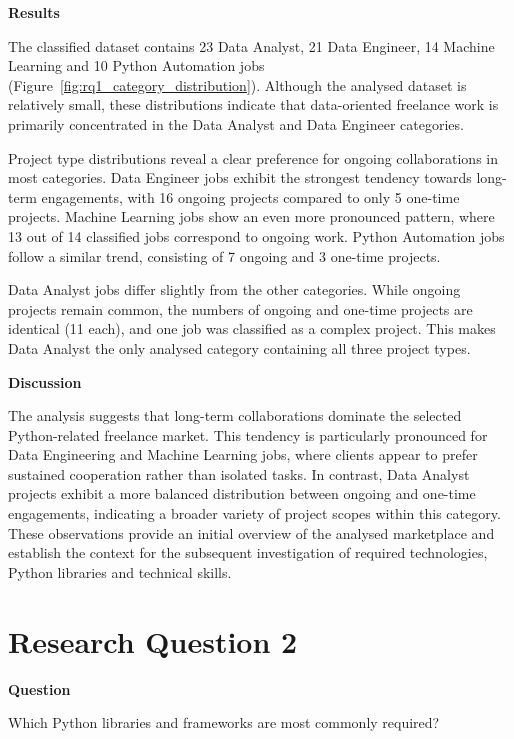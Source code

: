 \medskip

\textbf{Results}

The classified dataset contains 23 Data Analyst, 21 Data Engineer, 14 Machine Learning and 10 Python Automation jobs
(Figure~\ref{fig:rq1_category_distribution}). Although the analysed dataset is relatively small, these distributions indicate that data-oriented freelance work is
primarily concentrated in the Data Analyst and Data Engineer categories.

Project type distributions reveal a clear preference for ongoing collaborations in most categories. Data Engineer jobs exhibit the strongest tendency towards
long-term engagements, with 16 ongoing projects compared to only 5 one-time projects. Machine Learning jobs show an even more pronounced pattern, where 13
out of 14 classified jobs correspond to ongoing work. Python Automation jobs follow a similar trend, consisting of 7 ongoing and 3 one-time projects.

Data Analyst jobs differ slightly from the other categories. While ongoing projects remain common, the numbers of ongoing and one-time projects are identical
(11 each), and one job was classified as a complex project. This makes Data Analyst the only analysed category containing all three project types.

\medskip

\textbf{Discussion}

The analysis suggests that long-term collaborations dominate the selected Python-related freelance market. This tendency is particularly pronounced for
Data Engineering and Machine Learning jobs, where clients appear to prefer sustained cooperation rather than isolated tasks. In contrast, Data Analyst projects
exhibit a more balanced distribution between ongoing and one-time engagements, indicating a broader variety of project scopes within this category.
These observations provide an initial overview of the analysed marketplace and establish the context for the subsequent investigation of required technologies,
Python libraries and technical skills.

\section{Research Question 2}

\textbf{Question}

Which Python libraries and frameworks are most commonly required?

\medskip

